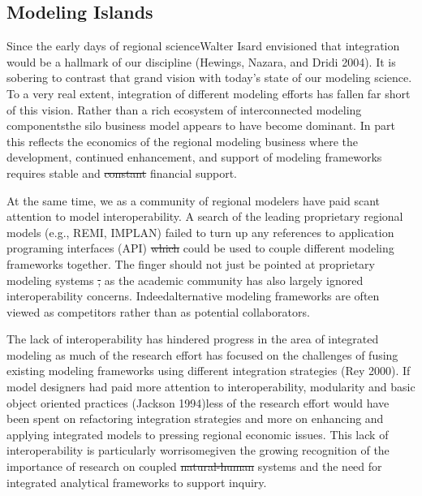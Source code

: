 \documentclass{article}
\providecommand{\DIFadd}[1]{{\protect\color{blue}\uwave{#1}}} %
\providecommand{\DIFdel}[1]{{\protect\color{red}\sout{#1}}}                      %
\providecommand{\DIFaddbegin}{} %
\providecommand{\DIFaddend}{} %
\providecommand{\DIFdelbegin}{} %
\providecommand{\DIFdelend}{} %
\begin{document}
\subsection{Modeling Islands}\label{modeling-islands}

Since the early days of regional science\DIFaddbegin \DIFadd{, }\DIFaddend Walter Isard envisioned that
integration would be a hallmark of our discipline (Hewings, Nazara, and
Dridi 2004). It is sobering to contrast that grand vision with today's
state of our modeling science. To a very real extent, integration of
different modeling efforts has fallen far short of this vision. Rather
than a rich ecosystem of interconnected modeling components\DIFaddbegin \DIFadd{, }\DIFaddend the silo
business model appears to have become dominant. In part this reflects
the economics of the regional modeling business where the development,
continued enhancement, and support of modeling frameworks requires
stable and \DIFdelbegin \DIFdel{constant }\DIFdelend \DIFaddbegin \DIFadd{continual }\DIFaddend financial support.

At the same time, we as a community of regional modelers have paid scant
attention to model interoperability. A search of the leading proprietary
regional models (e.g., REMI, IMPLAN) failed to turn up any references to
application programing interfaces (API) \DIFdelbegin \DIFdel{which }\DIFdelend \DIFaddbegin \DIFadd{that }\DIFaddend could be used to couple
different modeling frameworks together. The finger should not just be
pointed at proprietary modeling systems \DIFdelbegin \DIFdel{, }\DIFdelend as the academic community has
also largely ignored interoperability concerns. Indeed\DIFaddbegin \DIFadd{, developers of
}\DIFaddend alternative modeling frameworks are often viewed as competitors rather
than as potential collaborators.

The lack of interoperability has hindered progress in the area of
integrated modeling as much of the research effort has focused on the
challenges of fusing existing modeling frameworks using different
integration strategies (Rey 2000). If model designers had paid more
attention to interoperability, modularity and basic object oriented
practices (Jackson 1994)\DIFaddbegin \DIFadd{, }\DIFaddend less of the research effort would have been
spent on refactoring integration strategies and more on enhancing and
applying integrated models to pressing regional economic issues. This
lack of interoperability is particularly worrisome\DIFaddbegin \DIFadd{, }\DIFaddend given the growing
recognition of the importance of research on coupled \DIFdelbegin \DIFdel{natural-human
}\DIFdelend \DIFaddbegin \DIFadd{natural and human
}\DIFaddend systems and the need for integrated analytical frameworks to support
inquiry.
\end{document}
